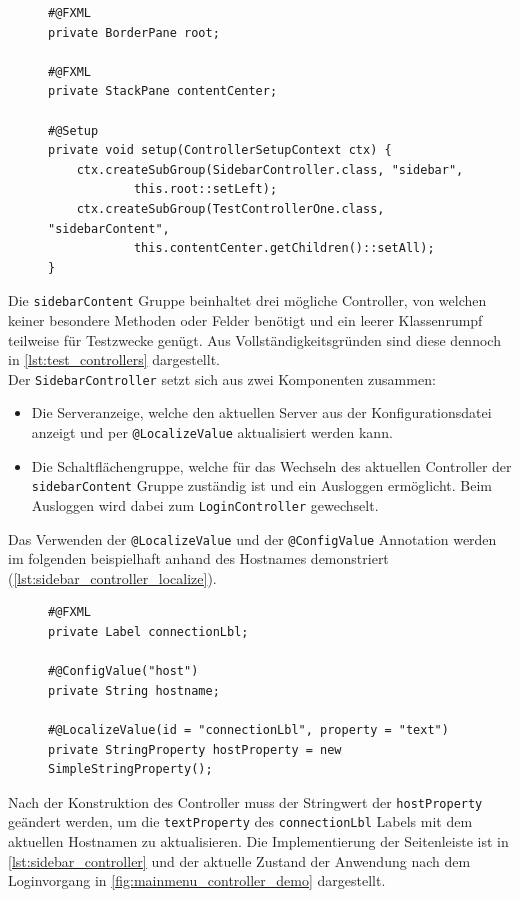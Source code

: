 \begin{figure}[H]
	\begin{lstlisting}[caption=Demo -- Subgruppen Einrichtung., captionpos=b, label=lst:mainmenu_controller_setup]
#@FXML
private BorderPane root;

#@FXML
private StackPane contentCenter;

#@Setup
private void setup(ControllerSetupContext ctx) {
    ctx.createSubGroup(SidebarController.class, "sidebar",
			this.root::setLeft);
    ctx.createSubGroup(TestControllerOne.class, "sidebarContent",
			this.contentCenter.getChildren()::setAll);
}
	\end{lstlisting}
\end{figure}
\noindent Die \texttt{sidebarContent} Gruppe beinhaltet drei mögliche Controller, von welchen keiner besondere Methoden oder Felder benötigt und ein leerer Klassenrumpf teilweise für Testzwecke genügt. Aus Vollständigkeitsgründen sind diese dennoch in \autoref{lst:test_controllers} dargestellt.\\
Der \texttt{SidebarController} setzt sich aus zwei Komponenten zusammen:
\begin{itemize}
	\item Die Serveranzeige, welche den aktuellen Server aus der Konfigurationsdatei anzeigt und per \texttt{@LocalizeValue} aktualisiert werden kann.
	\item Die Schaltflächengruppe, welche für das Wechseln des aktuellen Controller der \texttt{sidebarContent} Gruppe zuständig ist und ein Ausloggen ermöglicht. Beim Ausloggen wird dabei zum \texttt{LoginController} gewechselt.
\end{itemize}
Das Verwenden der \texttt{@LocalizeValue} und der \texttt{@ConfigValue} Annotation werden im folgenden beispielhaft anhand des Hostnames demonstriert (\autoref{lst:sidebar_controller_localize}).
\begin{figure}[H]
	\begin{lstlisting}[caption=Demo -- \texttt{@LocalizeValue} und \texttt{@ConfigValue}., captionpos=b, label=lst:sidebar_controller_localize]
#@FXML
private Label connectionLbl;

#@ConfigValue("host")
private String hostname;

#@LocalizeValue(id = "connectionLbl", property = "text")
private StringProperty hostProperty = new SimpleStringProperty();
	\end{lstlisting}
\end{figure}
\noindent Nach der Konstruktion des Controller muss der Stringwert der \texttt{hostProperty} geändert werden, um die \texttt{textProperty} des \texttt{connectionLbl} Labels mit dem aktuellen Hostnamen zu aktualisieren. Die Implementierung der Seitenleiste ist in \autoref{lst:sidebar_controller} und der aktuelle Zustand der Anwendung nach dem Loginvorgang in \autoref{fig:mainmenu_controller_demo} dargestellt.
